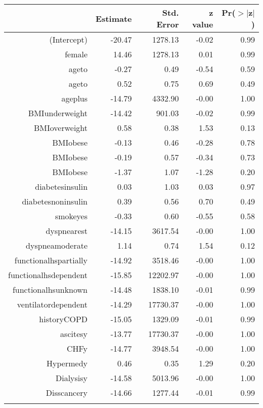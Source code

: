 \bigskip\bigskip
\centering
\begin{tabular}{rrrrr}
  \hline
 & Estimate & Std. Error & z value & Pr($>$$|$z$|$) \\ 
  \hline
(Intercept) & -20.47 & 1278.13 & -0.02 & 0.99 \\ 
  female & 14.46 & 1278.13 & 0.01 & 0.99 \\ 
  age\-65\-to\-74 & -0.27 & 0.49 & -0.54 & 0.59 \\ 
  age\-75\-to\-84 & 0.52 & 0.75 & 0.69 & 0.49 \\ 
  age\-85\-plus & -14.79 & 4332.90 & -0.00 & 1.00 \\ 
  BMI\-underweight & -14.42 & 901.03 & -0.02 & 0.99 \\ 
  BMI\-overweight & 0.58 & 0.38 & 1.53 & 0.13 \\ 
  BMI\-obese\-1 & -0.13 & 0.46 & -0.28 & 0.78 \\ 
  BMI\-obese\-2 & -0.19 & 0.57 & -0.34 & 0.73 \\ 
  BMI\-obese\-3 & -1.37 & 1.07 & -1.28 & 0.20 \\ 
  diabetes\-insulin & 0.03 & 1.03 & 0.03 & 0.97 \\ 
  diabetes\-noninsulin & 0.39 & 0.56 & 0.70 & 0.49 \\ 
  smoke\-yes & -0.33 & 0.60 & -0.55 & 0.58 \\ 
  dyspnea\-rest & -14.15 & 3617.54 & -0.00 & 1.00 \\ 
  dyspnea\-moderate & 1.14 & 0.74 & 1.54 & 0.12 \\ 
  functional\-hs\-partially & -14.92 & 3518.46 & -0.00 & 1.00 \\ 
  functional\-hs\-dependent & -15.85 & 12202.97 & -0.00 & 1.00 \\ 
  functional\-hs\-unknown & -14.48 & 1838.10 & -0.01 & 0.99 \\ 
  ventilator\-dependent & -14.29 & 17730.37 & -0.00 & 1.00 \\ 
  history\-COPD & -15.05 & 1329.09 & -0.01 & 0.99 \\ 
  ascites\-y & -13.77 & 17730.37 & -0.00 & 1.00 \\ 
  CHF\-y & -14.77 & 3948.54 & -0.00 & 1.00 \\ 
  Hyper\-med\-y & 0.46 & 0.35 & 1.29 & 0.20 \\ 
  Dialysis\-y & -14.58 & 5013.96 & -0.00 & 1.00 \\ 
  Diss\-cancer\-y & -14.66 & 1277.44 & -0.01 & 0.99 \\ 
$$
\end{tabular}
